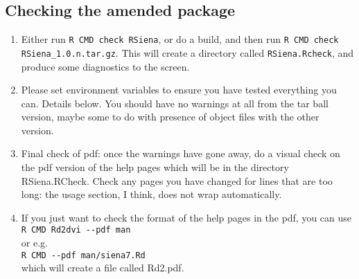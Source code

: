 \documentclass[12pt, a4paper]{article}
\renewcommand{\=}{\,=\,}
\newcommand{\+}{\,+\,}
\begin{document}
\subsection{Checking the amended package}
\begin{enumerate}
\item Either run \verb|R CMD check RSiena|, or do a build, and then
  run \verb|R CMD check RSiena_1.0.n.tar.gz|. This will create a directory
  called \verb|RSiena.Rcheck|, and produce some diagnostics to the
  screen.
\item Please set environment variables to ensure you have tested everything you
  can. Details below. You should have no warnings at all from
  the tar ball version, maybe some to do with presence of object files with the
  other version.
\item Final check of pdf: once the warnings have gone away, do a visual check on
  the pdf version of the help pages which will be in the directory
  RSiena.RCheck. Check any pages you have changed for lines that are too long:
  the usage section, I think, does not wrap automatically.
\item If you just want to check the format of the help pages in the pdf, you can
  use \\ \verb|R CMD Rd2dvi --pdf man| \\ or e.g.\ \\
  \verb|R CMD --pdf man/siena7.Rd|\\ which will create a file called Rd2.pdf.
\end{enumerate}
\end{document}
